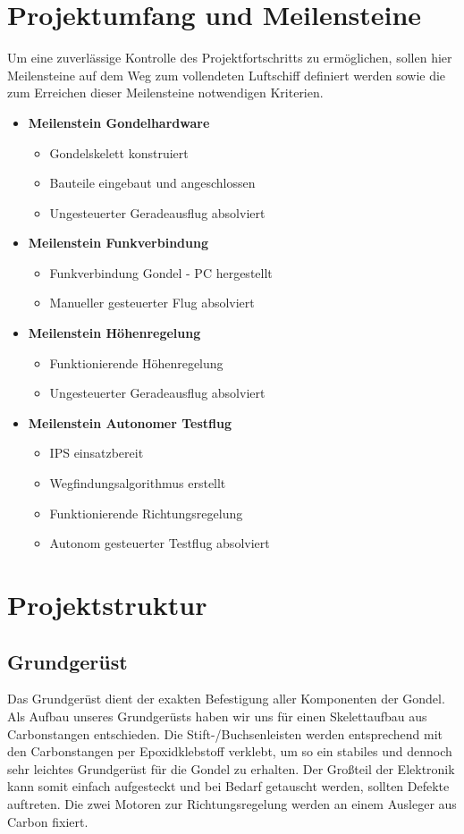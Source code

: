 \documentclass[lang=ngerman,inputenc=utf8,fontsize=10pt]{ldvarticle}
\begin{document}
\section{Projektumfang und Meilensteine}
Um eine zuverlässige Kontrolle des Projektfortschritts zu ermöglichen, sollen hier Meilensteine auf dem Weg zum vollendeten Luftschiff definiert werden sowie die zum Erreichen dieser Meilensteine notwendigen Kriterien.

\begin{itemize}
	\item \textbf{Meilenstein Gondelhardware}
		\begin{itemize}
			\item Gondelskelett konstruiert
			\item Bauteile eingebaut und angeschlossen
			\item Ungesteuerter Geradeausflug absolviert
		\end{itemize}
	\item \textbf{Meilenstein Funkverbindung}
		\begin{itemize}
			\item Funkverbindung Gondel - PC hergestellt
			\item Manueller gesteuerter Flug absolviert
		\end{itemize}
	\item \textbf{Meilenstein Höhenregelung}
		\begin{itemize}
			\item Funktionierende Höhenregelung
			\item Ungesteuerter Geradeausflug absolviert
		\end{itemize}
	\item \textbf{Meilenstein Autonomer Testflug}
		\begin{itemize}
			\item IPS einsatzbereit
			\item Wegfindungsalgorithmus erstellt
			\item Funktionierende Richtungsregelung
			\item Autonom gesteuerter Testflug absolviert
		\end{itemize}
\end{itemize}

\section{Projektstruktur}

\subsection*{Grundgerüst}
Das Grundgerüst dient der exakten Befestigung aller Komponenten der Gondel.\\
Als Aufbau unseres Grundgerüsts haben wir uns für einen Skelettaufbau aus Carbonstangen entschieden. Die Stift-/Buchsenleisten werden entsprechend mit den Carbonstangen per Epoxidklebstoff verklebt, um so ein stabiles und dennoch sehr leichtes Grundgerüst für die Gondel zu erhalten. Der Großteil der Elektronik kann somit einfach aufgesteckt und bei Bedarf getauscht werden, sollten Defekte auftreten. Die zwei Motoren zur Richtungsregelung werden an einem Ausleger aus Carbon fixiert.
\end{document}
